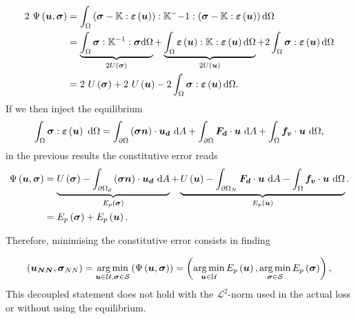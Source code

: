 \begin{equation}
	\begin{split}
			2~\Psi\left(\vect{u},\sigm\right) & =  \intV \left(\sigm - \ftensor{K}:\eps\left(\vect{u}\right)\right) : \ftensor{K}^-{-1}:\left(\sigm - \ftensor{K}:\eps\left(\vect{u}\right)\right) \dV\\ 
			& = \underbrace{\intV \sigm: \ftensor{K}^{-1}: \sigm \dV}_{2U\left(\sigm\right)} + \underbrace{\intV \eps\left(\vect{u}\right):\ftensor{K}:\eps\left(\vect{u}\right) \dV}_{2U\left(\vect{u}\right)}+ 2\intV\sigm:\eps\left(\vect{u}\right)\dV\\
			& = 2~ U\left(\sigm\right) +2~ U\left(\vect{u}\right) - 2\intV\sigm:\eps\left(\vect{u}\right)\dV.\\
	\end{split}
\end{equation}
If we then inject the equilibrium 
\begin{equation}
	\intV\sigm:\eps\left(\vect{u}\right)~\dV = \intS \left(\sigm\vect{n}\right) \cdot \vect{u_d}~\dS +  \intS \vect{F_d}\cdot \vect{u} ~\dS +\intV \vect{f_v}\cdot\vect{u}~\dV,
\end{equation}
in the previous results the constitutive error reads 
\begin{equation}
		\begin{split}
			\Psi\left(\vect{u},\sigm\right)  & = \underbrace{U\left(\sigm\right) - \intSd \left(\sigm\vect{n}\right) \cdot \vect{u_d}~\dS }_{E_p\left(\sigm\right)} +\underbrace{U\left(\vect{u}\right) -  \intSn \vect{F_d}\cdot \vect{u} ~\dS -\intV \vect{f_v}\cdot\vect{u}~\dV}_{E_p\left(\vect{u}\right)}.\\
			& =E_p\left(\sigm\right)+E_p\left(\vect{u}\right).
		\end{split}
\end{equation}

Therefore, minimising the constitutive error consists in finding 

\begin{equation}
	\left(\vect{u_{NN}},\sigm_{NN}\right) = \argmin_{\vect{u}\in \mathcal{U}, \sigm \in \mathcal{S}} \left(\Psi\left(\vect{u},\sigm\right)\right) =  \left(\argmin_{\vect{u}\in \mathcal{U}}E_p\left(\vect{u}\right),\argmin_{\sigm\in \mathcal{S}}E_p\left(\sigm\right)\right),
\end{equation}
This decoupled statement does not hold with the $\mathcal{L}^2$-norm used in the actual loss or without using the equilibrium.



